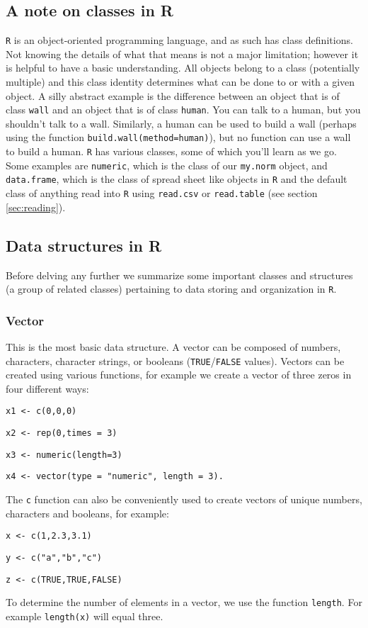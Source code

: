 \documentclass[12pt]{article}
\newcommand{\R}[1] {
	\item \texttt{#1}
}
\newenvironment{verbatim}{ 
	\indent
	\begin{list}{}{\setlength{\itemsep}{-1.5mm}}
}{
	\end{list}
}
\begin{document}
\subsection{A note on classes in R}
\verb+R+ is an object-oriented programming language, and as such has class definitions.  Not knowing the details of what that means is not a major limitation; however it is helpful to have a basic understanding.  All objects belong to a class (potentially multiple) and this class identity determines what can be done to or with a given object.  A silly abstract example is the difference between an object that is of class \verb+wall+ and an object that is of class \verb+human+.  You can talk to a human, but you shouldn't talk to a wall.  Similarly, a human can be used to build a wall (perhaps using the function \verb+build.wall(method=human)+), but no function can use a wall to build a human.  \verb+R+ has various classes, some of which you'll learn as we go. Some examples are \verb+numeric+, which is the class of our \verb+my.norm+ object, and \verb+data.frame+, which is the class of spread sheet like objects in \verb+R+ and the default class of anything read into \verb+R+ using \verb+read.csv+ or \verb+read.table+ (see section \ref{sec:reading}).

\subsection{Data structures in R}
Before delving any further we summarize some important classes and structures (a group of related classes) pertaining to data storing and organization in \verb+R+.

\subsubsection{Vector}	\label{sec:vector}
This is the most basic data structure.  A vector can be composed of numbers, characters, character strings, or booleans (\verb+TRUE+/\verb+FALSE+ values).  Vectors can be created using various functions, for example we create a vector of three zeros in four different ways:
\begin{verbatim}
	\R{x1 <- c(0,0,0)}
	\R{x2 <- rep(0,times = 3)}
	\R{x3 <- numeric(length=3)}
	\R{x4 <- vector(type = "numeric", length = 3).}
\end{verbatim}
The \verb+c+ function can also be conveniently used to create vectors of unique numbers, characters and booleans, for example:
\begin{verbatim}
	\R{x <- c(1,2.3,3.1)}
	\R{y <- c("a","b","c")}
	\R{z <- c(TRUE,TRUE,FALSE)}
\end{verbatim}
To determine the number of elements in a vector, we use the function \verb+length+.  For example \verb+length(x)+ will equal three.
\end{document}
